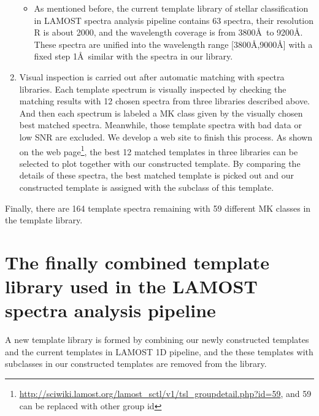 \documentclass[manuscript]{aastex}
\begin{document}
\begin{enumerate}
\begin{itemize}
        \item As mentioned before, the current template library of stellar classification in LAMOST spectra analysis pipeline contains 63 spectra,
        their resolution R is about 2000, and the wavelength coverage is from 3800\AA\ to 9200\AA.
        These spectra are unified into the wavelength range [3800\AA,9000\AA] with a fixed step 1\AA\ similar with the spectra in our library.
    \end{itemize}
\item Visual inspection is carried out  after automatic  matching with spectra libraries.
Each template spectrum is visually inspected by checking the matching results with 12 chosen spectra from three libraries described above.
And then each spectrum is labeled a MK class given by the   visually chosen best matched spectra.
Meanwhile, those template spectra with bad data or low SNR are excluded.
We develop a web site to finish this process.
As shown on the web page\footnote{\url{http://sciwiki.lamost.org/lamost_sctl/v1/tsl_groupdetail.php?id=59}, and 59 can be replaced with other group id},
the best 12 matched templates in three libraries can be  selected to plot together with our constructed template.
By comparing the details of these spectra,
the best matched template is picked out and our constructed template is assigned with the subclass of this template.


\end{enumerate}

Finally,  there are 164 template spectra remaining with 59 different MK classes in the template library.

\section{The finally combined template library used in the LAMOST spectra analysis pipeline}
\label{sect:Results}
A new template library is formed by combining our newly constructed templates and the current templates in LAMOST 1D pipeline,
and the these templates with subclasses in our constructed templates are removed from the library.
\end{document}
